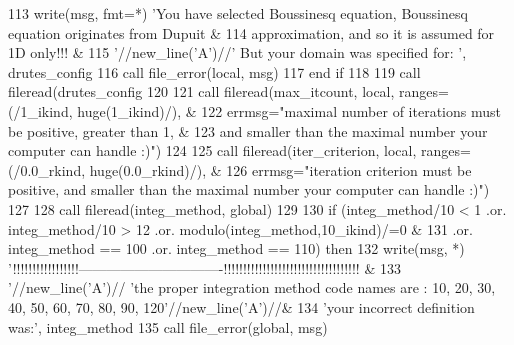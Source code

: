 \begin{DoxyCode}
113         \textcolor{keyword}{write}(msg, fmt=*) \textcolor{stringliteral}{'You have selected Boussinesq equation, Boussinesq equation originates from
       Dupuit &}
114 \textcolor{stringliteral}{}\textcolor{stringliteral}{                   approximation, and so it is assumed for 1D only!!! &}
115 \textcolor{stringliteral}{}\textcolor{stringliteral}{                   '}//new\_line(\textcolor{stringliteral}{'A'})//\textcolor{stringliteral}{'    But your domain was specified for: '}, 
      drutes_config%
116         \textcolor{keyword}{call }file_error(local, msg)
117 \textcolor{keywordflow}{      end if}
118 
119       \textcolor{keyword}{call }fileread(drutes_config%
120 \textcolor{comment}{      }
121 \textcolor{comment}{      }\textcolor{keyword}{call }fileread(max_itcount, local, ranges=(/1\_ikind, huge(1\_ikind)/\textcolor{comment}{), &}
122 \textcolor{comment}{      errmsg=}\textcolor{stringliteral}{"maximal number of iterations must be positive, greater than 1, &}
123 \textcolor{stringliteral}{}\textcolor{stringliteral}{              and smaller than the maximal number your computer can handle :)"})
124       
125       \textcolor{keyword}{call }fileread(iter_criterion, local, ranges=(/0.0\_rkind, huge(0.0\_rkind\textcolor{comment}{)/), &}
126 \textcolor{comment}{      errmsg=}\textcolor{stringliteral}{"iteration criterion must be positive, and smaller than the maximal number your computer can
       handle :)"}\textcolor{comment}{)}
127 \textcolor{comment}{}
128 \textcolor{comment}{      }\textcolor{keyword}{call }fileread(integ_method, global)
129       
130       \textcolor{keywordflow}{if} (integ_method/10 < 1 .or. integ_method/10 > 12 .or. modulo(integ_method\textcolor{comment}{,10\_ikind)/=0  &}
131 \textcolor{comment}{          .or. integ_method == 100 .or. integ_method == 110) }\textcolor{keywordflow}{then}
132           \textcolor{keyword}{write}(msg, *)  \textcolor{stringliteral}{
      '!!!!!!!!!!!!!!!!!-------------------------------!!!!!!!!!!!!!!!!!!!!!!!!!!!!!!!!!!! &}
133 \textcolor{stringliteral}{}\textcolor{stringliteral}{        '}//new\_line(\textcolor{stringliteral}{'A'})// \textcolor{stringliteral}{'the proper integration method code names are : 10, 20, 30, 40, 50, 60, 70, 80,
       90, 120'}\textcolor{comment}{//new\_line(}\textcolor{stringliteral}{'A'}\textcolor{comment}{)//&}
134 \textcolor{comment}{         }\textcolor{stringliteral}{'your incorrect definition was:'}, integ_method
135         \textcolor{keyword}{call }file_error(global, msg)

\end{DoxyCode}
